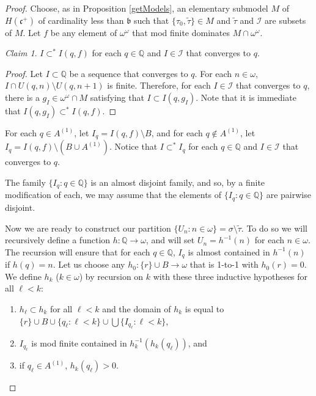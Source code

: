 \documentclass{amsart}
\theoremstyle{definition}
\theoremstyle{remark}
\newtheorem{claim}{Claim}
\begin{document}
   \begin{proof}
   Choose, as in Proposition \ref{getModels},
   an elementary submodel $M$ of $H(\mathfrak c^+)$ of cardinality
    less than $\mathfrak b$ such that $\{\tau_0,\tilde \tau \}\in M$
    and $\tilde \tau$ and $\mathcal I$ are subsets of $M$. 
    Let $f$ be any element of $\omega^\omega$ that mod finite  dominates
     $M\cap \omega^\omega$. 

     \begin{claim} 
     $I\subset^* I(q,f)$ 
     for each $q\in \mathbb Q$ and $I\in\mathcal I$ that
     converges to $q$. 
     \end{claim}

\bgroup
\def\proofname{Proof of Claim.}

\begin{proof}  Let $I\subset \mathbb Q$ be a sequence that converges
to $q$. For each $n\in\omega$, $I\cap U(q,n)\setminus U(q,n+1)$ is finite. 
Therefore, for each $I\in \mathcal I$ that converges to $q$,
 there is a $g_I\in \omega^\omega\cap M$ satisfying that
  $I\subset I(q,g_I)$. Note that it is immediate
  that $I(q,g_I)\subset^* I(q,f)$. 
\end{proof}



For each $q\in A^{(1)}$, let $I_q = I(q,f)\setminus B$,
 and for each $q\notin A^{(1)}$, let $I_q = I(q,f)\setminus
  (B\cup A^{(1)})$.  Notice that $I \subset^* I_q$
  for each $q\in \mathbb Q$ and $I\in \mathcal I$ that
   converges to $q$. 

The family $\{ I_q : q\in \mathbb Q\}$ is an almost disjoint
family, and so, by a finite modification of each,  we
 may assume that the 
 elements of   $\{ I_q : q\in \mathbb Q\}$ are
pairwise disjoint.   

 

     Now we are ready to construct our 
     partition $\{ U_n : n\in\omega\} = 
     \sigma\setminus \tilde \tau$. To do so
     we will recursively define a function $h: \mathbb Q
     \rightarrow \omega$, and will set $U_n = h^{-1}(n)$
     for each $n\in\omega$. The recursion will ensure
     that for each $q\in \mathbb Q$, $I_q$ is almost
     contained in $h^{-1}(n)$ if $h(q)=n$. 
Let us choose any $h_0 : \{r\}\cup B \rightarrow \omega$
that is 1-to-1 with $h_0(r) = 0$. We   
define $h_k$ ($k\in\omega$)
by recursion on $k$ with these three inductive hypotheses
for all $\ell<k$:
\begin{enumerate}
\item $h_\ell\subset h_k$ for all $\ell<k$ and
  the domain of $h_k$ is equal to 
  $\{r\}\cup B \cup \{ q_\ell : \ell<k\}\cup 
    \bigcup\{  I_{q_\ell} : \ell < k\}
    $,
    \item    
     $I_{q_\ell} $ is mod finite contained
     in $h_k^{-1}(h_k(q_\ell))$, and
      \item   if $q_\ell\in A^{(1)}$, $h_k(q_\ell)>0$.
      \end{enumerate}


\end{proof}
\end{document}
